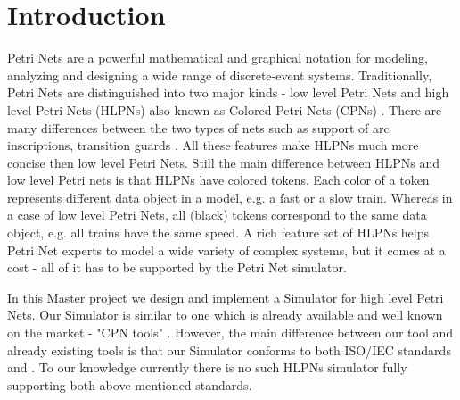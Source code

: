 \chapter{Introduction}

Petri Nets are a powerful mathematical and graphical notation for modeling, analyzing and designing a wide range of discrete-event systems. Traditionally, Petri Nets are distinguished into two major kinds - low level Petri Nets and high level Petri Nets (HLPNs) also known as Colored Petri Nets (CPNs) \cite{cpn-tools-book}. There are many differences between the two types of nets such as support of arc inscriptions, transition guards \cite{pn-comparison}. All these features make HLPNs much more concise then low level Petri Nets. Still the main difference between HLPNs and low level Petri nets is that HLPNs have colored tokens. Each color of a token represents different data object in a model, e.g. a fast or a slow train. Whereas in a case of low level Petri Nets, all (black) tokens correspond to the same data object, e.g. all trains have the same speed. A rich feature set of HLPNs helps Petri Net experts to model a wide variety of complex systems, but it comes at a cost - all of it has to be supported by the Petri Net simulator.

In this Master project we design and implement a Simulator for high level Petri Nets. Our Simulator is similar to one which is already available and well known on the market - "CPN tools" \cite{cpntools}. However, the main difference between our tool and already existing tools is that our Simulator conforms to both ISO/IEC standards \cite{15909-1:2004} and \cite{15909-2:2011}. To our knowledge currently there is no such HLPNs simulator fully supporting both above mentioned standards.

